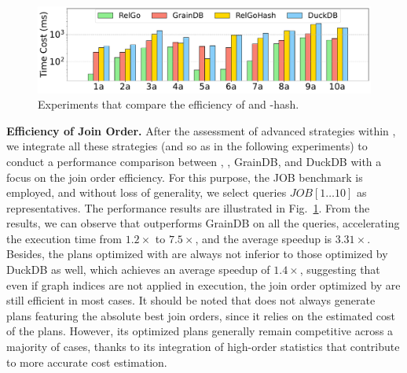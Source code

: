 \begin{figure}[ht]
    \centering
    \includegraphics[width=\linewidth]{./figures/exp/hash_plan_job.pdf}
    \caption{Experiments that compare the efficiency of \name and \name-hash.}
    \label{fig:exp-hash-plan}
\end{figure}

\noindent\textbf{Efficiency of Join Order.}
After the assessment of advanced strategies within \name, we integrate all these strategies (and so as in the following experiments) to conduct a performance comparison between \name, \relgohash, GrainDB, and DuckDB with a focus on the join order efficiency.
For this purpose, the JOB benchmark is employed, and without loss of generality, we select queries $JOB[1\ldots 10]$ as representatives.
The performance results are illustrated in Fig.~\ref{fig:exp-hash-plan}.
From the results, we can observe that \name outperforms GrainDB on all the queries, accelerating the execution time from $1.2\times$ to $7.5\times$, and the average speedup is $3.31\times$.
Besides, the plans optimized with \relgohash are always not inferior to those optimized by DuckDB as well, which achieves an average speedup of $1.4\times$, suggesting that even if graph indices are not applied in execution, the join order optimized by \name are still efficient in most cases.
It should be noted that \name does not always generate plans featuring the absolute best join orders, since it relies on the estimated cost of the plans.
However, its optimized plans generally remain competitive across a majority of cases, thanks to its integration of high-order statistics that contribute to more accurate cost estimation.


